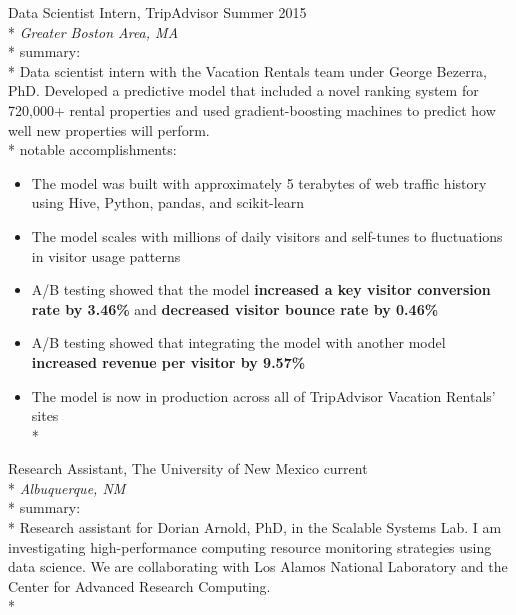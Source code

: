 \documentclass[print]{friggeri-cv} %
\begin{document}
\iftoggle{cv}{
\section{research/work experience}
}{
\section{selected research/work experience}
}
\begin{description} \itemsep1pt \parskip0pt 
  \item {\largeheaderfont Data Scientist Intern, TripAdvisor} \hfill
    {\smallheaderfont Summer 2015}\\*
    {\footnotesize \emph{Greater Boston Area, MA}} \\*
    {\smallheaderfont summary}: \\*
    Data scientist intern with the Vacation Rentals team under George Bezerra, PhD.
    Developed a predictive model that included a novel ranking system for
    720,000+ rental properties and used gradient-boosting machines to predict
    how well new properties will perform. \\*
    {\smallheaderfont notable accomplishments}:
    \begin{itemize} \itemsep1pt \parskip1pt 
      \item The model was built with approximately 5 terabytes of web traffic
            history using Hive, Python, pandas, and scikit-learn
      \item The model scales with millions of daily visitors and self-tunes to
            fluctuations in visitor usage patterns
      \item A/B testing showed that the model \textbf{increased a key visitor conversion
            rate by 3.46\%} and \textbf{decreased visitor bounce rate by 0.46\%}
      \item A/B testing showed that integrating the model with another model
            \textbf{increased revenue per visitor by 9.57\%}
      \item The model is now in production across all of TripAdvisor Vacation Rentals' sites\\*
    \end{itemize}

  \item {\largeheaderfont Research Assistant, The University of New Mexico} \hfill
    {\textemdash current}\\*
    {\footnotesize \emph{Albuquerque, NM }} \\*
    {\smallheaderfont summary}: \\*
    Research assistant for Dorian Arnold, PhD, in the Scalable Systems Lab.  I
    am investigating high-performance computing resource monitoring strategies
    using data science. We are collaborating with Los Alamos National
    Laboratory and the Center for Advanced Research Computing. \\*


\end{description}
\end{document}
